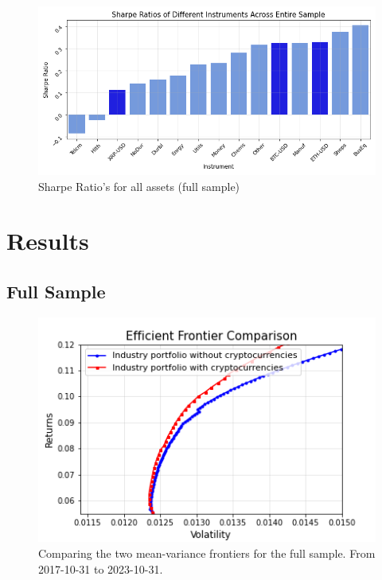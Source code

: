 \documentclass[12pt,a4paper]{article}
\begin{document}
\begin{figure}[H]
    \centering
    \includegraphics[width=1\linewidth]{Figures/SR_Entire_Sample.png}
    \caption{Sharpe Ratio's for all assets (full sample)}
    \label{fig:Sharpe}
\end{figure}


\section{Results}\label{sec:results}

\subsection{Full Sample}\label{sec:full sample}
\begin{figure}[H]
    \centering
    \includegraphics[width=1\linewidth]{Figures/Efficient_Frontier_Comparison_Full_Sample.png}
    \caption{Comparing the two mean-variance frontiers for the full sample. From 2017-10-31 to 2023-10-31.}
    \label{fig:full}
\end{figure}
\end{document}
